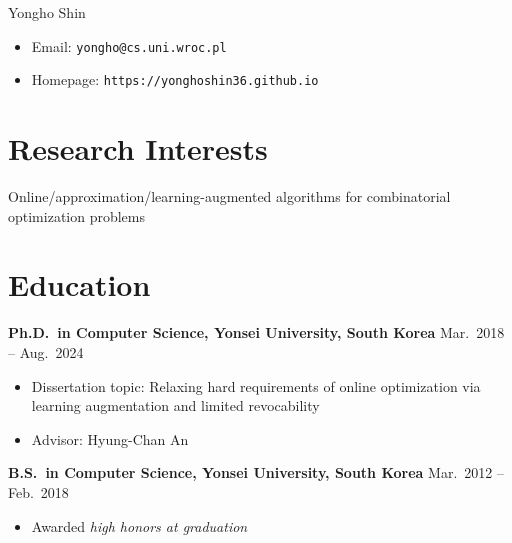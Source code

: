 \documentclass{article}
\newcommand{\killinitspace}{-0.7em}
\begin{document}
{\Huge Yongho Shin}
\begin{itemize}[itemsep=-3pt, leftmargin=2.5pt, label=]
\item Email: \texttt{yongho@cs.uni.wroc.pl}
\item Homepage: \texttt{https://yonghoshin36.github.io}
\end{itemize}

\section{Research Interests}
Online/approximation/learning-augmented algorithms for combinatorial optimization problems

\section{Education}
\textbf{Ph.D.~in Computer Science, Yonsei University, South Korea} \hfill Mar.~2018 -- Aug.~2024
\vspace{\killinitspace}
\begin{itemize}
\item Dissertation topic: Relaxing hard requirements of online optimization via learning augmentation and limited revocability
\item Advisor: Hyung-Chan An
\end{itemize}

\textbf{B.S.~in Computer Science, Yonsei University, South Korea} \hfill Mar.~2012 -- Feb.~2018
\vspace{\killinitspace}
\begin{itemize}
\item Awarded \textsl{high honors at graduation}
\end{itemize}
\end{document}
